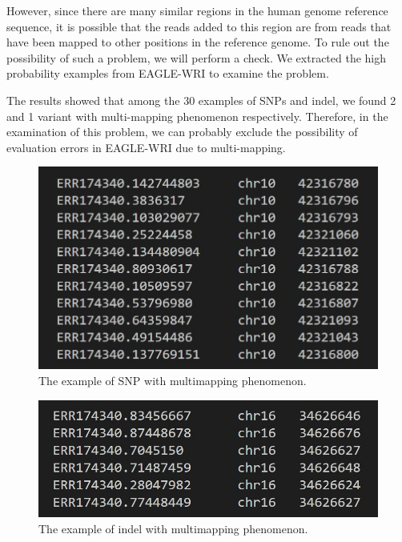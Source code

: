 \documentclass[PhD]{PHlab-thesis}
\begin{document}
However, since there are many similar regions in the human genome reference sequence, it is possible that the reads added to this region are from reads that have been mapped to other positions in the reference genome. To rule out the possibility of such a problem, we will perform a check. We extracted the high probability examples from EAGLE-WRI to examine the problem. 

The results showed that among the 30 examples of SNPs and indel, we found 2 and 1 variant with multi-mapping phenomenon respectively. Therefore, in the examination of this problem, we can probably exclude the possibility of evaluation errors in EAGLE-WRI due to multi-mapping.

\begin{figure}[h!]
	\centering
	\includegraphics[scale=0.4]{figures/chr10mulltimapping.jpg}
	\caption{The example of SNP with multimapping phenomenon.}
	\label{fig:The example of SNP with multimapping phenomenon} %
\end{figure}

\begin{figure}[h!]
	\centering
	\includegraphics[scale=0.4]{figures/indelmulltimapping.jpg}
	\caption{The example of indel with multimapping phenomenon.}
	\label{fig:The example of indel with multimapping phenomenon} %
\end{figure}
\end{document}
